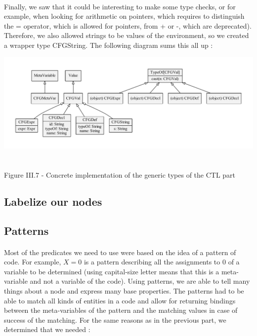 \documentclass{report}
\begin{document}
\paragraph{}
\hspace{4mm}Finally, we saw that it could be interesting to make some type checks, or for example, when looking for arithmetic on pointers, which requires to distinguish the = operator, which is allowed for pointers, from + or -, which are deprecated).
Therefore, we also allowed strings to be values of the environment, so we created a wrapper type CFGString. The following diagram sums this all up :

\begin{center}
\includegraphics[scale=0.65]{data/merge_types}
~\\~\\Figure III.7 - Concrete implementation of the generic types of the CTL part
\end{center}

\subsection{Labelize our nodes}

\subsection* {Patterns}
\paragraph{}
\hspace{4mm}Most of the predicates we need to use were based on the idea of a pattern of code. For example, $X = 0$ is a pattern describing all the assignments to 0
of a variable to be determined (using capital-size letter means that this is a meta-variable and not a variable of the code). Using patterns, we are able 
to tell many things about a node and express many base properties. The patterns had to be able to match all kinds of entities in a code and allow for 
returning bindings between the meta-variables of the pattern and the matching values in case of success of the matching. For the same reasons as in the
previous part, we determined that we needed :
\end{document}
